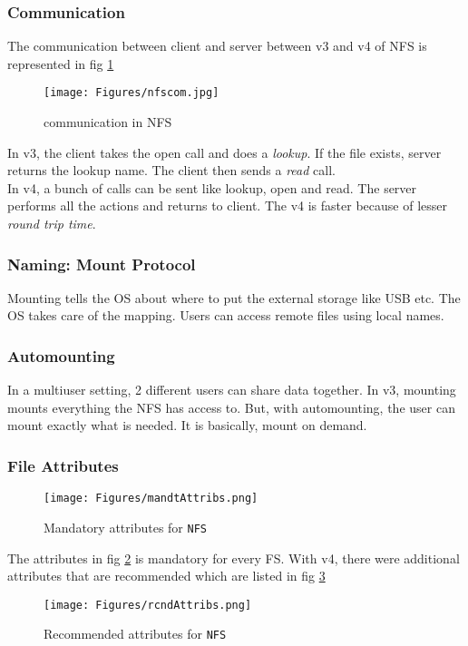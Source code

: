 \documentclass[twoside]{article}
\begin{document}
\subsubsection{Communication}
The communication between client and server between v3 and v4 of NFS is represented in fig \ref{nfscom}

\begin{figure}[htbp]
\centering
\texttt{[image: Figures/nfscom.jpg]}
\caption{communication in NFS} \label{nfscom}
\end{figure}

In v3, the client takes the open call and does a \emph{lookup}. If the file exists, server returns the lookup name. The client then sends a \emph{read} call. \\
In v4, a bunch of calls can be sent like lookup, open and read. The server performs all the actions and returns to client. The v4 is faster because of lesser \emph{round trip time}. 

\subsubsection{Naming: Mount Protocol}

Mounting tells the OS about where to put the external storage like USB etc. The OS takes care of the mapping. Users can access remote files using local names. 

\subsubsection{Automounting}
In a multiuser setting, 2 different users can share data together. In v3, mounting mounts everything the NFS has access to. But, with automounting, the user can mount exactly what is needed. It is basically, mount on demand. 

\subsubsection{File Attributes}
\begin{figure}[htbp]
\centering
\texttt{[image: Figures/mandtAttribs.png]}
\caption{Mandatory attributes for \texttt{NFS}} \label{md}
\end{figure}
The attributes in fig \ref{md} is mandatory for every FS. With v4, there were additional attributes that are recommended which are listed in fig \ref{rc}

\begin{figure}[htbp]
\centering
\texttt{[image: Figures/rcndAttribs.png]}
\caption{Recommended attributes for \texttt{NFS}} \label{rc}
\end{figure}
\end{document}
